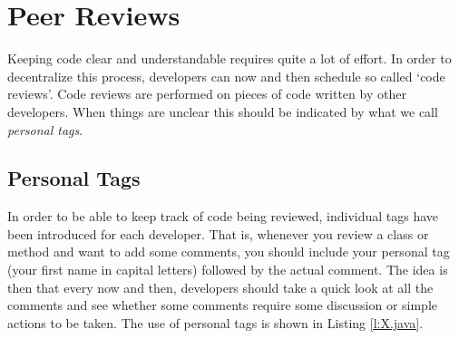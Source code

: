 \section{Peer Reviews}

Keeping code clear and understandable requires quite a lot of effort. In order to decentralize this process, developers can now and then schedule so called `code reviews'. Code reviews are performed on pieces of code written by other developers. When things are unclear this should be indicated by what we call {\em personal tags}.

\subsection{Personal Tags}

In order to be able to keep track of code being reviewed, individual tags have been introduced for each developer. That is, whenever you review a class or method and want to add some comments, you should include your personal tag (your first name in capital letters) followed by the actual comment. The idea is then that every now and then, developers should take a quick look at all the comments and see whether some comments require some discussion or simple actions to be taken. The use of personal tags is shown in Listing \ref{l:X.java}.

